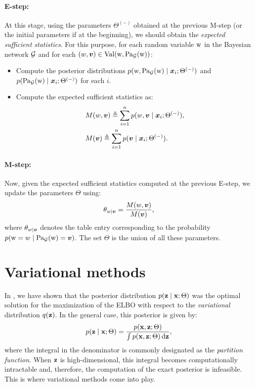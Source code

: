 \paragraph{E-step:} At this stage, using the parameters $\Theta^{(-)}$ obtained at the previous M-step (or the initial parameters if at the beginning), we should obtain the \emph{expected sufficient statistics}. For this purpose, for each random variable ${\textnormal{w}}$ in the Bayesian network ${\mathcal{G}}$ and for each $(w,{\bm{v}}) \in \mathrm{Val}({\textnormal{w}},\mathrm{Pa}_{\mathcal{G}}({\textnormal{w}}))$:
\begin{itemize}
    \item Compute the posterior distributions $p({\textnormal{w}},\mathrm{Pa}_{\mathcal{G}}({\textnormal{w}}) \mid {\bm{x}}_i; \Theta^{(-)})$ and $p(\mathrm{Pa}_{\mathcal{G}}({\textnormal{w}}) \mid {\bm{x}}_i; \Theta^{(-)})$ for each $i$.
    \item Compute the expected sufficient statistics as:
     \begin{align}
         &M(w,{\bm{v}}) \triangleq \sum_{i=1}^n p(w,{\bm{v}} \mid {\bm{x}}_i; \Theta^{(-)}), \label{eq:joint_suf_stat}\\
         &M({\bm{v}}) \triangleq \sum_{i=1}^n p({\bm{v}} \mid {\bm{x}}_i; \Theta^{(-)}). \label{eq:marginal_suf_stat}
     \end{align}
\end{itemize}

\paragraph{M-step:} Now, given the expected sufficient statistics computed at the previous E-step, we update the parameters $\Theta$ using:
\begin{equation}
    \theta_{w \mid {\bm{v}}} = \frac{M(w,{\bm{v}})}{M({\bm{v}})},
\end{equation}
where $\theta_{w \mid {\bm{v}}}$ denotes the table entry corresponding to the probability $p({\textnormal{w}}=w \mid \mathrm{Pa}_{\mathcal{G}}({\textnormal{w}})={\bm{v}})$. The set $\Theta$ is the union of all these parameters.

\section{Variational methods}
\label{sec:variational_methods}

In , we have shown that the posterior distribution $p({\mathbf{z}} \mid {\mathbf{x}}; \Theta)$ was the optimal solution for the maximization of the ELBO with respect to the \emph{variational} distribution $q({\mathbf{z}})$. In the general case, this posterior is given by:
\begin{equation}
    p({\mathbf{z}} \mid {\mathbf{x}}; \Theta) = \frac{p({\mathbf{x}}, {\mathbf{z}}; \Theta)}{\int p({\mathbf{x}}, {\mathbf{z}}; \Theta) {\,\text{d}} {\mathbf{z}}},
\end{equation}
where the integral in the denominator is commonly designated as the \emph{partition function}. When ${\mathbf{z}}$ is high-dimensional, this integral becomes computationally intractable and, therefore, the computation of the exact posterior is infeasible. This is where variational methods come into play.